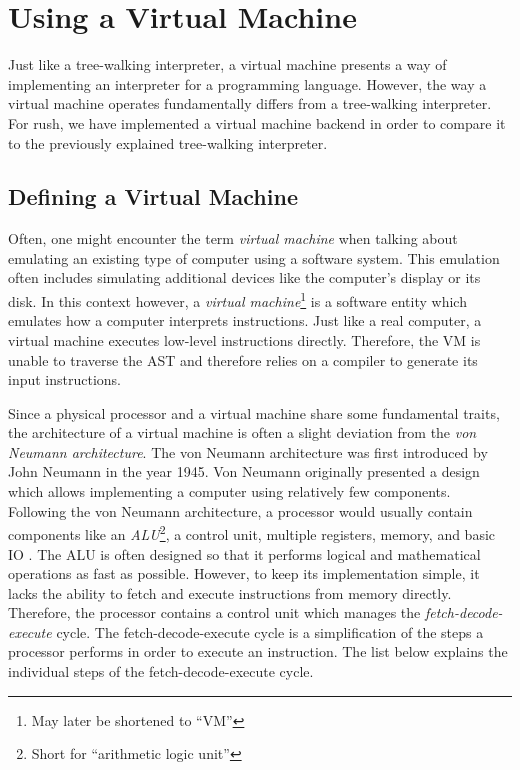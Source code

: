 \section{Using a Virtual Machine}

Just like a tree-walking interpreter, a virtual machine presents a way of implementing an interpreter for a programming language.
However, the way a virtual machine operates fundamentally differs from a tree-walking interpreter.
For rush, we have implemented a virtual machine backend in order to compare it to the previously explained tree-walking interpreter.

\subsection{Defining a Virtual Machine}

Often, one might encounter the term \emph{virtual machine} when talking about emulating an existing type of computer using a software system.
This emulation often includes simulating additional devices like the computer's display or its disk.
In this context however, a \emph{virtual machine}\footnote{May later be shortened to \enquote{VM}} is a software entity which emulates how a computer interprets instructions.
Just like a real computer, a virtual machine executes low-level instructions directly.
Therefore, the VM is unable to traverse the AST and therefore relies on a compiler to generate its input instructions.

Since a physical processor and a virtual machine share some fundamental traits,
the architecture of a virtual machine is often a slight deviation from the \emph{von Neumann architecture}.
The von Neumann architecture was first introduced by John Neumann in the year 1945.
Von Neumann originally presented a design which allows implementing a computer using relatively few components.
Following the von Neumann architecture, a processor would usually contain components like an \emph{ALU}\footnote{Short for \enquote{arithmetic logic unit}}, a control unit, multiple registers, memory, and basic IO \cite[p.~172]{Ledin2020-yp}.
The ALU is often designed so that it performs logical and mathematical operations as fast as possible.
However, to keep its implementation simple, it lacks the ability to fetch and execute instructions from memory directly.
Therefore, the processor contains a control unit which manages the \emph{fetch-decode-execute} cycle.
The fetch-decode-execute cycle is a simplification of the steps a processor performs in order to execute an instruction.
The list below explains the individual steps of the fetch-decode-execute cycle.

